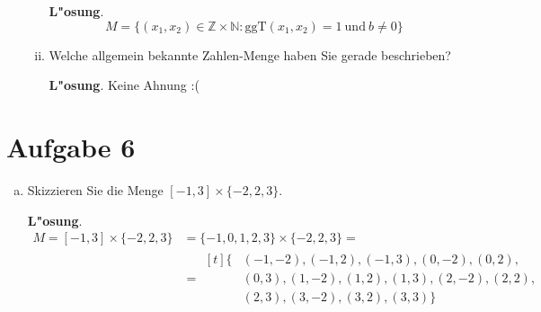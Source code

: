 \documentclass[10pt, a4paper, oneside]{article}
\begin{document}
\begin{enumerate}[(a)]
\begin{enumerate}[i)]
                \textbf{L"osung}.
                $$M = \{ (x_1, x_2) \in \mathbb{Z} \times \mathbb{N} : \text{ggT}(x_1, x_2) = 1\ \text{und}\ b \neq 0 \}$$

            \item Welche allgemein bekannte Zahlen-Menge haben Sie gerade beschrieben?

                \textbf{L"osung}.
                Keine Ahnung :(
          \end{enumerate}
\end{enumerate}

\section{Aufgabe 6}

\begin{enumerate}[(a)]
    \item Skizzieren Sie die Menge $[-1, 3] \times \{-2,2,3\}$.

        \textbf{L"osung}.
        \begin{align*}
            M = [-1, 3] \times \{-2,2,3\} &= \{-1, 0, 1, 2, 3\} \times \{-2, 2, 3\} = \\
                                          &=
                    \begin{aligned}[t]
                        \{&(-1, -2), (-1, 2), (-1, 3), (0, -2), (0, 2),\\
                          &(0, 3), (1, -2), (1, 2), (1, 3), (2, -2), (2, 2),\\
                          &(2, 3), (3, -2), (3, 2), (3, 3)\}
                    \end{aligned}
        \end{align*}


\end{enumerate}
\end{document}
